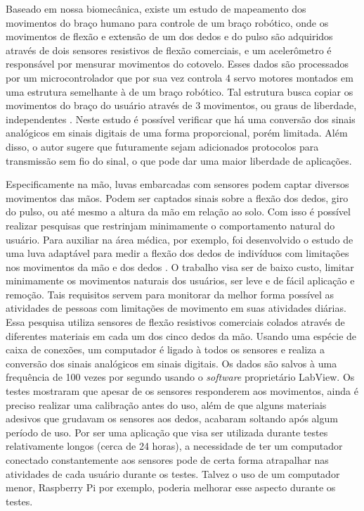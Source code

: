 \documentclass[
	12pt,				%
	openright,			%
	oneside,			%
	a4paper,			%
	english,			%
	brazil				%
	]{abntex2}
\begin{document}
		Baseado em nossa biomecânica, existe um estudo de mapeamento dos movimentos do braço humano para controle de um braço robótico, onde os movimentos de flexão e extensão de um dos dedos e do pulso são adquiridos através de dois sensores resistivos de flexão comerciais, e um acelerômetro é responsável por mensurar movimentos do cotovelo. Esses dados são processados por um microcontrolador que por sua vez controla 4 servo motores montados em uma estrutura semelhante à de um braço robótico. Tal estrutura busca copiar os movimentos do braço do usuário através de 3 movimentos, ou graus de liberdade, independentes \cite{syed2012armcontroller}. Neste estudo é possível verificar que há uma conversão dos sinais analógicos em sinais digitais de uma forma proporcional, porém limitada. Além disso, o autor sugere que futuramente sejam adicionados protocolos para transmissão sem fio do sinal, o que pode dar uma maior liberdade de aplicações.
		
		Especificamente na mão, luvas embarcadas com sensores podem captar diversos movimentos das mãos. Podem ser captados sinais sobre a flexão dos dedos, giro do pulso, ou até mesmo a altura da mão em relação ao solo. Com isso é possível realizar pesquisas que restrinjam minimamente o comportamento natural do usuário. Para auxiliar na área médica, por exemplo, foi desenvolvido o estudo de uma luva adaptável para medir a flexão dos dedos de indivíduos com limitações nos movimentos da mão e dos dedos \cite{simone2004lowcost}. O trabalho visa ser de baixo custo, limitar minimamente os movimentos naturais dos usuários, ser leve e de fácil aplicação e remoção. Tais requisitos servem para monitorar da melhor forma possível as atividades de pessoas com limitações de movimento em suas atividades diárias. Essa pesquisa utiliza sensores de flexão resistivos comerciais colados através de diferentes materiais em cada um dos cinco dedos da mão. Usando uma espécie de caixa de conexões, um computador é ligado à todos os sensores e realiza a conversão dos sinais analógicos em sinais digitais. Os dados são salvos à uma frequência de 100 vezes por segundo usando o \textit{software} proprietário LabView. Os testes mostraram que apesar de os sensores responderem aos movimentos, ainda é preciso realizar uma calibração antes do uso, além de que alguns materiais adesivos que grudavam os sensores aos dedos, acabaram soltando após algum período de uso. Por ser uma aplicação que visa ser utilizada durante testes relativamente longos (cerca de 24 horas), a necessidade de ter um computador conectado constantemente aos sensores pode de certa forma atrapalhar nas atividades de cada usuário durante os testes. Talvez o uso de um computador menor, Raspberry Pi por exemplo, poderia melhorar esse aspecto durante os testes.
		
\end{document}
